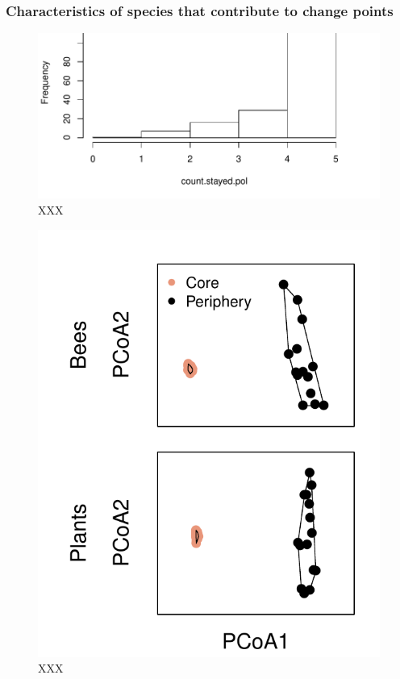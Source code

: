 \documentclass[12pt]{article}
\begin{document}
\subsubsection*{Characteristics of species that contribute to change
  points}

\begin{figure}
  \centering
  \includegraphics[width=.8\textwidth]{../analysis/variability/figures/cv/occ_degree.pdf}
  \caption{XXX}
  \label{fig:cv}
\end{figure}
\clearpage




\begin{figure}
  \centering
  \includegraphics[width=.7\textwidth]{../analysis/changePoint/plotting/figures/pcoa/pcoa.pdf}
  \caption{XXX}
  \label{fig:pcoa}
\end{figure}
\clearpage
\end{document}
